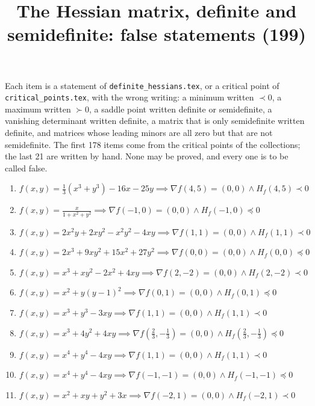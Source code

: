 \documentclass[11pt,a4paper]{article}
\title{The Hessian matrix, definite and semidefinite: false statements (199)}
\author{}
\date{}
\begin{document}
\maketitle
Each item is a statement of \texttt{definite\_hessians.tex}, or a critical point of \texttt{critical\_points.tex}, with the wrong writing: a minimum written $\prec 0$, a maximum written $\succ 0$, a saddle point written definite or semidefinite, a vanishing determinant written definite, a matrix that is only semidefinite written definite, and matrices whose leading minors are all zero but that are not semidefinite. The first 178 items come from the critical points of the collections; the last 21 are written by hand. None may be proved, and every one is to be called false.

\begin{enumerate}
\item $\displaystyle f(x, y) = \frac{1}{3}(x^{3} + y^{3}) - 16x - 25y \implies \nabla f(4, 5) = (0, 0) \land H_{f}(4, 5) \prec 0$
\item $\displaystyle f(x, y) = \frac{x}{1 + x^{2} + y^{2}} \implies \nabla f(-1, 0) = (0, 0) \land H_{f}(-1, 0) \preceq 0$
\item $\displaystyle f(x, y) = 2x^{2} y + 2x y^{2} - x^{2} y^{2} - 4xy \implies \nabla f(1, 1) = (0, 0) \land H_{f}(1, 1) \prec 0$
\item $\displaystyle f(x, y) = 2x^{3} + 9x y^{2} + 15x^{2} + 27y^{2} \implies \nabla f(0, 0) = (0, 0) \land H_{f}(0, 0) \preceq 0$
\item $\displaystyle f(x, y) = x^{3} + x y^{2} - 2x^{2} + 4xy \implies \nabla f(2, -2) = (0, 0) \land H_{f}(2, -2) \prec 0$
\item $\displaystyle f(x, y) = x^{2} + y(y - 1)^{2} \implies \nabla f(0, 1) = (0, 0) \land H_{f}(0, 1) \preceq 0$
\item $\displaystyle f(x, y) = x^{3} + y^{3} - 3xy \implies \nabla f(1, 1) = (0, 0) \land H_{f}(1, 1) \prec 0$
\item $\displaystyle f(x, y) = x^{3} + 4y^{2} + 4xy \implies \nabla f\left( \frac{2}{3}, -\frac{1}{3} \right) = (0, 0) \land H_{f}\left( \frac{2}{3}, -\frac{1}{3} \right) \preceq 0$
\item $\displaystyle f(x, y) = x^{4} + y^{4} - 4xy \implies \nabla f(1, 1) = (0, 0) \land H_{f}(1, 1) \prec 0$
\item $\displaystyle f(x, y) = x^{4} + y^{4} - 4xy \implies \nabla f(-1, -1) = (0, 0) \land H_{f}(-1, -1) \preceq 0$
\item $\displaystyle f(x, y) = x^{2} + xy + y^{2} + 3x \implies \nabla f(-2, 1) = (0, 0) \land H_{f}(-2, 1) \prec 0$

\end{enumerate}
\end{document}
